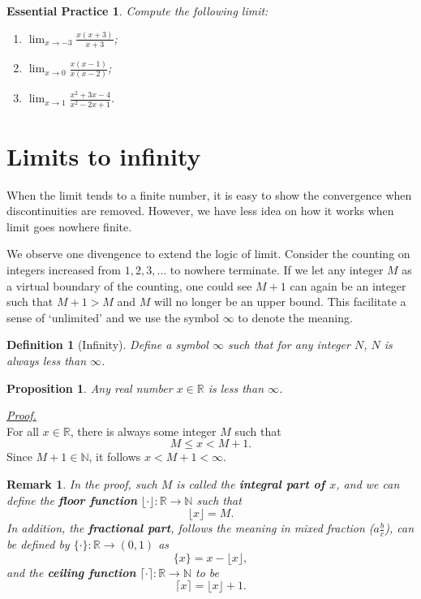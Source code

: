 \documentclass[12pt]{article}
\newtheorem{definition}{Definition}[section]
\newtheorem*{proposition}{Proposition}
\newtheorem*{remark}{Remark}
\newtheorem{exercise}{Essential Practice}[section]
\renewenvironment{proof}[1][Proof]{\begin{snugshade*} \underline{\textit{{#1}.}}\\}{\hfill \qedsymbol \end{snugshade*}}
\begin{document}
    \begin{exercise}
        Compute the following limit:
        \begin{enumerate}
            \item $\displaystyle \lim_{x\to -3}\frac{x(x+3)}{x+3}$;
            \item $\displaystyle \lim_{x\to 0}\frac{x(x-1)}{x(x-2)}$;
            \item $\displaystyle \lim_{x\to 1}\frac{x^2+3x-4}{x^2-2x+1}$.
        \end{enumerate}
    \end{exercise}

    \section{Limits to infinity}

    When the limit tends to a finite number, it is easy to show the convergence when discontinuities are removed. However, we have less idea on how it works when limit goes nowhere finite.
    
    We observe one divengence to extend the logic of limit. Consider the counting on integers increased from $1,2,3,\dots$ to nowhere terminate. If we let any integer $M$ as a virtual boundary of the counting, one could see $M+1$ can again be an integer such that $M+1>M$ and $M$ will no longer be an upper bound. This facilitate a sense of `unlimited' and we use the symbol $\infty$ to denote the meaning.

    \begin{definition}[Infinity]
        Define a symbol $\infty$ such that for any integer $N$, $N$ is always less than $\infty$.
    \end{definition}

    \begin{proposition}
        Any real number $x\in\mathbb{R}$ is less than $\infty$.
    \end{proposition}

    \begin{proof}
        For all $x\in \mathbb{R}$, there is always some integer $M$ such that \[M\leq x< M+1.\] Since $M+1\in\mathbb{N}$, it follows $x<M+1<\infty$.
    \end{proof}

    \begin{remark}
        In the proof, such $M$ is called the \textbf{integral part of $x$}, and we can define the \textbf{floor function} $\lfloor \cdot \rfloor:\mathbb{R}\to\mathbb{N}$ such that \[\lfloor x \rfloor = M.\] In addition, the \textbf{fractional part}, follows the meaning in mixed fraction ($a\frac{b}{c}$), can be defined by $\{\cdot\}:\mathbb{R}\to (0,1)$ as \[\{x\}=x-\lfloor x \rfloor,\] and the \textbf{ceiling function} $\lceil \cdot \rceil:\mathbb{R}\to\mathbb{N}$ to be \[\lceil x \rceil=\lfloor x \rfloor + 1.\]
    \end{remark}
\end{document}
